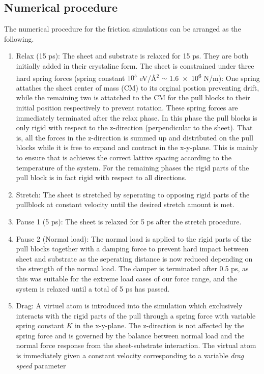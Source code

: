 \subsection{Numerical procedure}

The numerical procedure for the friction simulations can be arranged as the following.

\begin{enumerate}
  \item Relax (15 ps): The sheet and substrate is relaxed for 15 ps. They are
  both initially added in their crystaline form. The sheet is constrained under
  three hard spring forces (spring constant $10^5$ eV/Å$^2$ $\sim$ \num{1.6e6} N/m): One spring
  attathes the sheet center of mass (CM) to its orginal postion preventing
  drift, while the remaining two is attatched to the CM for the pull blocks to
  their initial position respectively to prevent rotation. These spring forces
  are immediately terminated after the relax phase. In this phase the pull
  blocks is only rigid with respect to the z-direction (perpendicular to the
  sheet). That is, all the forces in the z-direction is summed up and
  distributed on the pull blocks while it is free to expand and contract in the
  x-y-plane. This is mainly to ensure that is achieves the correct lattive
  spacing according to the temperature of the system. For the remaining phases
  the rigid parts of the pull block is in fact rigid with respect to all
  directions. 
  \item Stretch: The sheet is stretched by seperating to opposing rigid parts of
  the pullblock at constant velocity until the desired stretch amount is met. 
  \item Pause 1 (5 ps): The sheet is relaxed for 5 ps after the stretch
  procedure.
  \item Pause 2 (Normal load): The normal load is applied to the rigid parts of
  the pull blocks together with a damping force to prevent hard impact between
  sheet and substrate as the seperating distance is now reduced depending on the
  strength of the normal load. The damper is terminated after 0.5 ps, as this
  was suitable for the extreme load cases of our force range, and the system is
  relaxed until a total of 5 ps has passed.
  \item Drag: A virtuel atom is introduced into the simulation which exclusively
  interacts with the rigid parts of the pull through a spring force with variable spring constant $K$ in the x-y-plane. The z-direction is not affected by the spring force and is governed by the balance between normal load and the normal force response from the sheet-substrate interaction. The virtual atom is immediately given a constant velocity corresponding to a variable \textit{drag speed} parameter
\end{enumerate}

